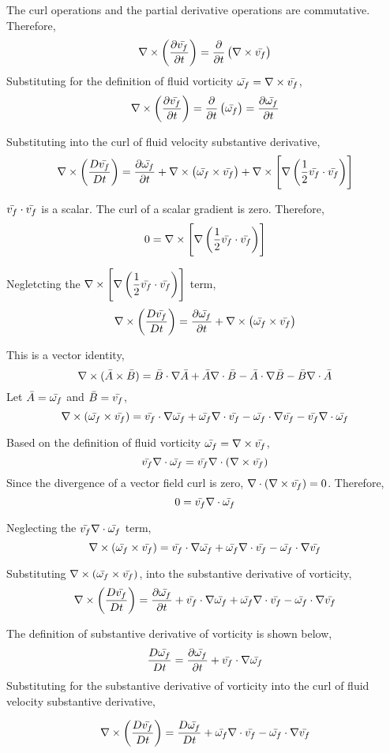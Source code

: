 \documentclass[class=report, 12pt, crop=false]{standalone}
\begin{document}
\begin{center}
The curl operations and the partial derivative operations are commutative. Therefore,
$$\nabla\times\left(\frac{\partial \bar{v_f}}{\partial t}\right) = \frac{\partial }{\partial t}\left(\nabla\times\bar{v_f}\right)$$
Substituting for the definition of fluid vorticity $\displaystyle \bar{\omega_f} = \nabla\times \bar{v_f}$,
$$\nabla\times\left(\frac{\partial \bar{v_f}}{\partial t}\right) = \frac{\partial }{\partial t}\left(\bar{\omega_f}\right) = \frac{\partial \bar{\omega_f}}{\partial t}$$

Substituting into the curl of fluid velocity substantive derivative,
$$\nabla\times\left(\frac{D \bar{v_f}}{Dt}\right) = \frac{\partial \bar{\omega_f}}{\partial t} + \nabla\times\left(\bar{\omega_f}\times \bar{v_f}\right) + \nabla\times\left[\nabla\left(\frac{1}{2}\bar{v_f}\cdot\bar{v_f}\right)\right]$$

$\bar{v_f}\cdot\bar{v_f}$ is a scalar. The curl of a scalar gradient is zero. Therefore,
$$0 = \nabla\times\left[\nabla\left(\frac{1}{2}\bar{v_f}\cdot\bar{v_f}\right)\right]$$

Negletcting the $\displaystyle \nabla\times\left[\nabla\left(\frac{1}{2}\bar{v_f}\cdot\bar{v_f}\right)\right]$ term,
$$\nabla\times\left(\frac{D \bar{v_f}}{Dt}\right) = \frac{\partial \bar{\omega_f}}{\partial t} + \nabla\times\left(\bar{\omega_f}\times \bar{v_f}\right)$$

This is a vector identity,
$$\nabla\times (\bar{A}\times \bar{B}) = \bar{B}\cdot\nabla \bar{A} + \bar{A}\nabla\cdot \bar{B} - \bar{A}\cdot\nabla \bar{B} - \bar{B}\nabla\cdot \bar{A}$$
Let $\bar{A} = \bar{\omega_f}$ and $\bar{B} = \bar{v_f}$,
$$\nabla\times (\bar{\omega_f}\times \bar{v_f}) = \bar{v_f}\cdot\nabla \bar{\omega_f} + \bar{\omega_f}\nabla\cdot \bar{v_f} - \bar{\omega_f}\cdot\nabla \bar{v_f} - \bar{v_f}\nabla\cdot \bar{\omega_f}$$

Based on the definition of fluid vorticity $\bar{\omega_f} = \nabla\times\bar{v_f}$,
$$\bar{v_f}\nabla\cdot \bar{\omega_f} = \bar{v_f}\nabla\cdot (\nabla\times\bar{v_f})$$
Since the divergence of a vector field curl is zero, $\displaystyle \nabla\cdot (\nabla\times\bar{v_f})=0$. Therefore,
$$0 = \bar{v_f}\nabla\cdot \bar{\omega_f}$$

Neglecting the $\displaystyle \bar{v_f}\nabla\cdot \bar{\omega_f}$ term,
$$\nabla\times (\bar{\omega_f}\times \bar{v_f}) = \bar{v_f}\cdot\nabla \bar{\omega_f} + \bar{\omega_f}\nabla\cdot \bar{v_f} - \bar{\omega_f}\cdot\nabla \bar{v_f}$$


Substituting $\displaystyle \nabla\times (\bar{\omega_f}\times \bar{v_f})$, into the substantive derivative of vorticity,
$$\nabla\times\left(\frac{D \bar{v_f}}{Dt}\right) = \frac{\partial \bar{\omega_f}}{\partial t} + \bar{v_f}\cdot\nabla \bar{\omega_f} + \bar{\omega_f}\nabla\cdot \bar{v_f} - \bar{\omega_f}\cdot\nabla \bar{v_f}$$



The definition of substantive derivative of vorticity is shown below,
$$\frac{D \bar{\omega_f}}{Dt} = \frac{\partial \bar{\omega_f}}{\partial t} + \bar{v_f}\cdot\nabla \bar{\omega_f}$$
Substituting for the substantive derivative of vorticity into the curl of fluid velocity substantive derivative,

$$\nabla\times\left(\frac{D \bar{v_f}}{Dt}\right) = \frac{D \bar{\omega_f}}{Dt} + \bar{\omega_f}\nabla\cdot \bar{v_f} - \bar{\omega_f}\cdot\nabla \bar{v_f}$$





\end{center}
\end{document}
